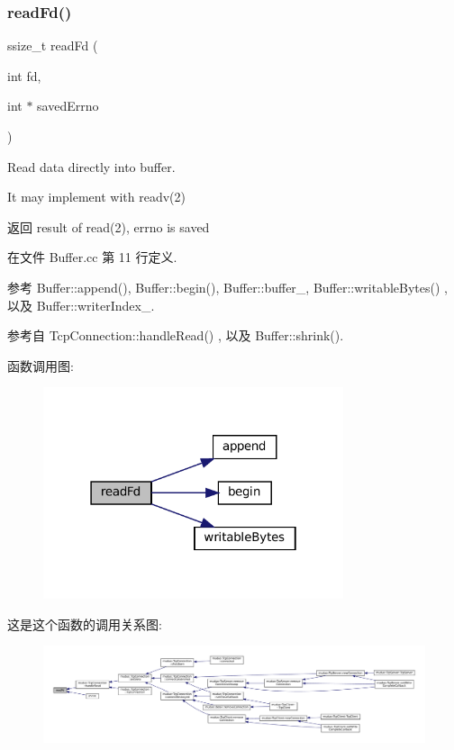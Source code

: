 \subsubsection{\texorpdfstring{read\+Fd()}{readFd()}}
{\footnotesize\ttfamily ssize\+\_\+t read\+Fd (\begin{DoxyParamCaption}\item[{int}]{fd,  }\item[{int $\ast$}]{saved\+Errno }\end{DoxyParamCaption})}

Read data directly into buffer.

It may implement with readv(2) \begin{DoxyReturn}{返回}
result of read(2), {\ttfamily errno} is saved 
\end{DoxyReturn}


在文件 Buffer.\+cc 第 11 行定义.



参考 Buffer\+::append(), Buffer\+::begin(), Buffer\+::buffer\+\_\+, Buffer\+::writable\+Bytes() , 以及 Buffer\+::writer\+Index\+\_\+.



参考自 Tcp\+Connection\+::handle\+Read() , 以及 Buffer\+::shrink().

函数调用图\+:
\nopagebreak
\begin{figure}[H]
\begin{center}
\leavevmode
\includegraphics[width=250pt]{classmuduo_1_1Buffer_abf4ee68d9e5290cdfb7f3854387f0576_cgraph}
\end{center}
\end{figure}
这是这个函数的调用关系图\+:
\nopagebreak
\begin{figure}[H]
\begin{center}
\leavevmode
\includegraphics[width=350pt]{classmuduo_1_1Buffer_abf4ee68d9e5290cdfb7f3854387f0576_icgraph}
\end{center}
\end{figure}
\mbox{\label{classmuduo_1_1Buffer_a25a9cdb4fcb89f6e3ff071517bdc09e8}} 
